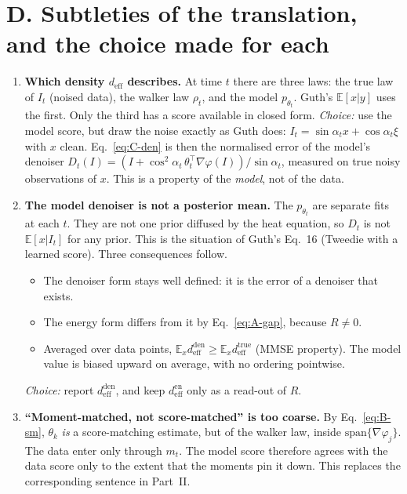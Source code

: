 \documentclass[11pt]{article}
\newcommand{\E}{\mathbb{E}}
\renewcommand{\_}{\origunderscore\allowbreak}
\newcommand{\deff}{d_{\mathrm{eff}}}
\begin{document}
\section{D. Subtleties of the translation, and the choice made for each}
\label{sec:D}

\begin{enumerate}
\item \textbf{Which density $\deff$ describes.} At time $t$ there are three
  laws: the true law of $I_t$ (noised data), the walker law $\rho_t$, and the
  model $p_{\theta_t}$. Guth's $\E[x|y]$ uses the first. Only the third has a
  score available in closed form. \emph{Choice:} use the model score, but
  draw the noise exactly as Guth does: $I_t=\sin\alpha_t x+\cos\alpha_t\xi$ with $x$
  clean. Eq.~\ref{eq:C-den} is then the normalised error of the model's
  denoiser $D_t(I)=(I+\cos^2\!\alpha_t\,\theta_t^\top\nabla\varphi(I))/\sin\alpha_t$, measured on true
  noisy observations of $x$. This is a property of the \emph{model}, not of the data.

\item \textbf{The model denoiser is not a posterior mean.} The
  $p_{\theta_t}$ are separate fits at each $t$. They are not one prior
  diffused by the heat equation, so $D_t$ is not $\E[x|I_t]$ for any prior.
  This is the situation of Guth's Eq.~16 (Tweedie with a learned score).
  Three consequences follow.
  \begin{itemize}
  \item The denoiser form stays well defined: it is the error of a denoiser that exists.
  \item The energy form differs from it by Eq.~\ref{eq:A-gap}, because $R\ne0$.
  \item Averaged over data points, $\E_x\deff^{\mathrm{den}}\ge\E_x\deff^{\mathrm{true}}$ (MMSE property).
    The model value is biased upward on average, with no ordering pointwise.
  \end{itemize}
  \emph{Choice:} report $\deff^{\mathrm{den}}$, and keep $\deff^{\mathrm{en}}$ only as a
  read-out of $R$.

\item \textbf{``Moment-matched, not score-matched'' is too coarse.} By Eq.~\ref{eq:B-sm},
  $\theta_k$ \emph{is} a score-matching estimate, but of the
  walker law, inside $\mathrm{span}\{\nabla\varphi_j\}$. The data enter only through $m_t$.
  The model score therefore agrees with the data score only to the extent
  that the moments pin it down. This replaces the corresponding sentence in Part~II.


\end{enumerate}
\end{document}
